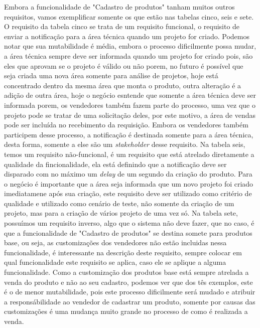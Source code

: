       Embora a funcionalidade de "Cadastro de produtos" tanham muitos outros requisitos,
      vamos exemplificar somente os que estão nas tabelas cinco, seis e sete.
      O requisito da tabela cinco se trata de um requisito funcional, o requisito de
      enviar a notificação para a área técnica quando um projeto for criado. Podemos
      notar que sua mutabilidade é média, embora o processo dificilmente possa mudar,
      a área técnica sempre deve ser informada quando um projeto for criado pois,
      são eles que aprovam se o projeto é válido ou não porem, no futuro é possível
      que seja criada uma nova área somente para análise de projetos, hoje está
      concentrado dentro da mesma área que monta o produto, outra alteração é a
      adição de outra área, hoje o negócio esntende que somente a área técnica deve
      ser informada porem, os vendedores também fazem parte do processo, uma vez que
      o projeto pode se tratar de uma solicitação deles, por este motivo, a área de
      vendas pode ser incluída no recebimento da requisição. Embora os vendedores
      também participem desse processo, a notificação é destinada somente para a área
      técnica, desta forma, somente a else são um \textit{stakeholder} desse
      requisito. Na tabela seis, temos um requisito não-funcional, é um requisito
      que está atrelado diretamente a qualidade da fincionalidade, ela está definindo
      que a notificação deve ser disparado com no máximo um \textit{delay} de um
      segundo da criação do produto. Para o negócio é importante que a área seja
      informada que um novo projeto foi criado imediatamene após sua criação, este
      requisito deve ser utilizado como critério de qualidade e utilizado como cenário
      de teste, não somente da criação de um projeto, mas para a criação de vários
      projeto de uma vez só. Na tabela sete, possuímos um requisito inverso, algo
      que o sistema não deve fazer, que no caso, é que a funcionalidade de "Cadastro
      de produtos" se destina somete para produtos base, ou seja, as customizações
      dos vendedores não estão incluidas nessa funcionalidade, é interessante na
      descrição deste requisito, sempre colocar em qual funcionalidade este requisito
      se aplica, caso ele se aplique a alguma funcionalidade. Como a customização
      dos produtos base está sempre atrelada a venda do produto e não ao seu
      cadastro, podemos ver que dos tês exemplos, este é o de menor mutabilidade,
      pois este processo dificilmente será mudado e atribuir a responsábilidade ao
      vendedor de cadastrar um produto, somente por causas das customizações é uma
      mudança muito grande no processo de como é realizada a venda.


